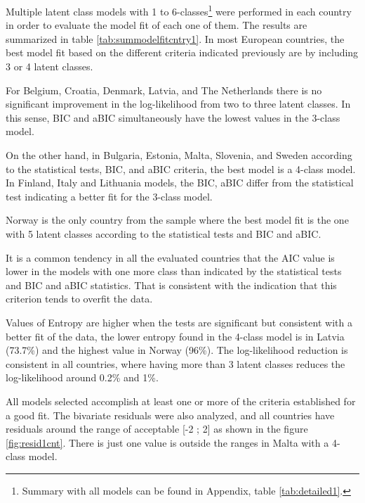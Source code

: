 \documentclass[12pt,a4paper,oneside]{reedthesis}
\begin{document}
Multiple latent class models with 1 to 6-classes\footnote{Summary with all models can be found in Appendix, table \ref{tab:detailed1}.} were performed in each country in order to evaluate the model fit of each one of them. The results are summarized in table \ref{tab:summodelfitcntry1}. In most European countries, the best model fit based on the different criteria indicated previously are by including 3 or 4 latent classes.

For Belgium, Croatia, Denmark, Latvia, and The Netherlands there is no significant improvement in the log-likelihood from two to three latent classes. In this sense, BIC and aBIC simultaneously have the lowest values in the 3-class model.

On the other hand, in Bulgaria, Estonia, Malta, Slovenia, and Sweden according to the statistical tests, BIC, and aBIC criteria, the best model is a 4-class model. In Finland, Italy and Lithuania models, the BIC, aBIC differ from the statistical test indicating a better fit for the 3-class model.

Norway is the only country from the sample where the best model fit is the one with 5 latent classes according to the statistical tests and BIC and aBIC.

It is a common tendency in all the evaluated countries that the AIC value is lower in the models with one more class than indicated by the statistical tests and BIC and aBIC statistics. That is consistent with the indication that this criterion tends to overfit the data.

Values of Entropy are higher when the tests are significant but consistent with a better fit of the data, the lower entropy found in the 4-class model is in Latvia (73.7\%) and the highest value in Norway (96\%). The log-likelihood reduction is consistent in all countries, where having more than 3 latent classes reduces the log-likelihood around 0.2\% and 1\%.

All models selected accomplish at least one or more of the criteria established for a good fit. The bivariate residuals were also analyzed, and all countries have residuals around the range of acceptable {[}-2 ; 2{]} as shown in the figure \ref{fig:resid1cnt}. There is just one value is outside the ranges in Malta with a 4-class model.
\end{document}
